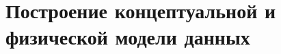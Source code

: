 \documentclass[../nirs.tex]{subfiles}
\begin{document}
\section{Построение концептуальной и физической модели данных}
\end{document}
